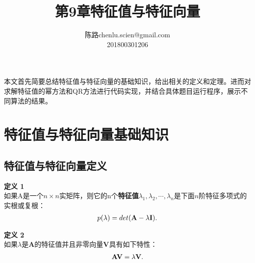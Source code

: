 \documentclass[UTF8]{ctexart}
\makeatletter
\newenvironment{dingyi}[2][定义]
{\begin{mdframed}[backgroundcolor=gray!20] \textbf{#1 #2} \\}
	{\end{mdframed}}
\newcommand\assignmentNumber{9}
\newcommand\studentName{陈路}
\newcommand\studentEmail{chenlu.scien@gmail.com}
\newcommand\studentNumber{201800301206}
\makeatother
\begin{document}
    
    \title{第\assignmentNumber 章\quad 特征值与特征向量}
    
    \author{\name \studentName \email \studentEmail \\
    \studentNumber
    }
    
    \maketitle
本文首先简要总结特征值与特征向量的基础知识，给出相关的定义和定理。进而对求解特征值的幂方法和QR方法进行代码实现，并结合具体题目运行程序，展示不同算法的结果。

\section{特征值与特征向量基础知识}
\subsection{特征值与特征向量定义}
\begin{dingyi}{1}
	如果A是一个$n\times n$实矩阵，则它的n个\textbf{特征值}$\lambda_1, \lambda_2, \cdots, \lambda_n$是下面$n$阶特征多项式的实根或复根：
	\begin{align}
		p(\lambda)=det(\mathbf{A} - \lambda \mathbf{I}). \notag
	\end{align}
\end{dingyi}
\begin{dingyi}{2}
	如果$\lambda$是$\mathbf{A}$的特征值并且非零向量$\mathbf{V}$具有如下特性：
	\begin{align}
	\mathbf{AV} = \lambda \mathbf{V}. \notag
	\end{align}
\end{dingyi}
\end{document}
